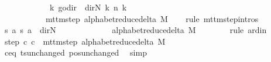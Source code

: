 \begin{isabellebody}
\ \ \ \ \ \ \ \ \ \ \ \ {\isacharparenleft}{\kern0pt}{\isasymlambda}k{\isachardot}{\kern0pt}\ go{\isacharunderscore}{\kern0pt}dir\ {\isacharparenleft}{\kern0pt}{\isacharparenleft}{\kern0pt}{\isasymlambda}{\isacharunderscore}{\kern0pt}{\isachardot}{\kern0pt}\ dir{\isachardot}{\kern0pt}N{\isacharparenright}{\kern0pt}\ k{\isacharparenright}{\kern0pt}\ {\isacharparenleft}{\kern0pt}n\ k{\isacharparenright}{\kern0pt}{\isacharparenright}{\kern0pt}{\isacharparenright}{\kern0pt}\isanewline
\ \ \ \ \ \ \ \ \ \ {\isasymin}\ mttm{\isacharunderscore}{\kern0pt}step\ {\isacharparenleft}{\kern0pt}alphabet{\isacharunderscore}{\kern0pt}reduce{\isacharunderscore}{\kern0pt}delta\ M{\isacharparenright}{\kern0pt}{\isachardoublequoteclose}\isanewline
\ \ \isamarkupfalse%
\ {\isacharparenleft}{\kern0pt}rule\ mttm{\isacharunderscore}{\kern0pt}step{\isachardot}{\kern0pt}intros{\isacharparenright}{\kern0pt}\isanewline
\ \ \ \ \isamarkupfalse%
\ {\isachardoublequoteopen}{\isacharparenleft}{\kern0pt}{\isacharquery}{\kern0pt}s{\isacharcomma}{\kern0pt}\ {\isacharquery}{\kern0pt}a{\isacharcomma}{\kern0pt}\ {\isacharquery}{\kern0pt}s{\isacharprime}{\kern0pt}{\isacharcomma}{\kern0pt}\ {\isacharquery}{\kern0pt}a{\isacharcomma}{\kern0pt}\ {\isacharparenleft}{\kern0pt}{\isasymlambda}{\isacharunderscore}{\kern0pt}{\isachardot}{\kern0pt}\ dir{\isachardot}{\kern0pt}N{\isacharparenright}{\kern0pt}{\isacharparenright}{\kern0pt}\isanewline
\ \ \ \ \ \ \ \ \ \ \ \ {\isasymin}\ alphabet{\isacharunderscore}{\kern0pt}reduce{\isacharunderscore}{\kern0pt}delta\ M{\isachardoublequoteclose}\isanewline
\ \ \ \ \ \ \isamarkupfalse%
\ {\isacharparenleft}{\kern0pt}rule\ ard{\isacharunderscore}{\kern0pt}in{\isacharparenright}{\kern0pt}\isanewline
\ \ \isamarkupfalse%
\isanewline
\ \ \isamarkupfalse%
\ step{\isacharcolon}{\kern0pt}\ {\isachardoublequoteopen}{\isacharparenleft}{\kern0pt}c{\isacharprime}{\kern0pt}{\isacharcomma}{\kern0pt}\ {\isacharquery}{\kern0pt}c{\isacharprime}{\kern0pt}{\isacharprime}{\kern0pt}{\isacharparenright}{\kern0pt}\ {\isasymin}\ mttm{\isacharunderscore}{\kern0pt}step\ {\isacharparenleft}{\kern0pt}alphabet{\isacharunderscore}{\kern0pt}reduce{\isacharunderscore}{\kern0pt}delta\ M{\isacharparenright}{\kern0pt}{\isachardoublequoteclose}\isanewline
\ \ \ \ \isamarkupfalse%
\ c{\isacharprime}{\kern0pt}{\isacharunderscore}{\kern0pt}eq\ ts{\isacharunderscore}{\kern0pt}unchanged\ pos{\isacharunderscore}{\kern0pt}unchanged\ \isamarkupfalse%
\ simp\isanewline

\end{isabellebody}
